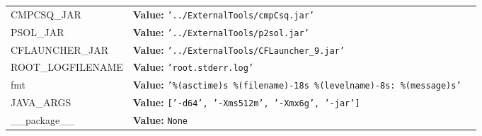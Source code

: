 \begin{longtable}{|p{\varnamewidth}|p{\vardescrwidth}|l}
\cline{1-2}
\raggedright C\-M\-P\-C\-S\-Q\-\_\-J\-A\-R\- & \raggedright \textbf{Value:} 
{\tt \texttt{'}\texttt{../ExternalTools/cmpCsq.jar}\texttt{'}}&\\
\cline{1-2}
\raggedright P\-2\-S\-O\-L\-\_\-J\-A\-R\- & \raggedright \textbf{Value:} 
{\tt \texttt{'}\texttt{../ExternalTools/p2sol.jar}\texttt{'}}&\\
\cline{1-2}
\raggedright C\-F\-L\-A\-U\-N\-C\-H\-E\-R\-\_\-J\-A\-R\- & \raggedright \textbf{Value:} 
{\tt \texttt{'}\texttt{../ExternalTools/CFLauncher\_9.jar}\texttt{'}}&\\
\cline{1-2}
\raggedright R\-O\-O\-T\-\_\-L\-O\-G\-F\-I\-L\-E\-N\-A\-M\-E\- & \raggedright \textbf{Value:} 
{\tt \texttt{'}\texttt{root.stderr.log}\texttt{'}}&\\
\cline{1-2}
\raggedright f\-m\-t\- & \raggedright \textbf{Value:} 
{\tt \texttt{'}\texttt{\%(asctime)s \%(filename)-18s \%(levelname)-8s: \%(message)s}\texttt{'}}&\\
\cline{1-2}
\raggedright J\-A\-V\-A\-\_\-A\-R\-G\-S\- & \raggedright \textbf{Value:} 
{\tt \texttt{[}\texttt{'}\texttt{-d64}\texttt{'}\texttt{, }\texttt{'}\texttt{-Xms512m}\texttt{'}\texttt{, }\texttt{'}\texttt{-Xmx6g}\texttt{'}\texttt{, }\texttt{'}\texttt{-jar}\texttt{'}\texttt{]}}&\\
\cline{1-2}
\raggedright \_\-\_\-p\-a\-c\-k\-a\-g\-e\-\_\-\_\- & \raggedright \textbf{Value:} 
{\tt None}&\\
\cline{1-2}
\end{longtable}

